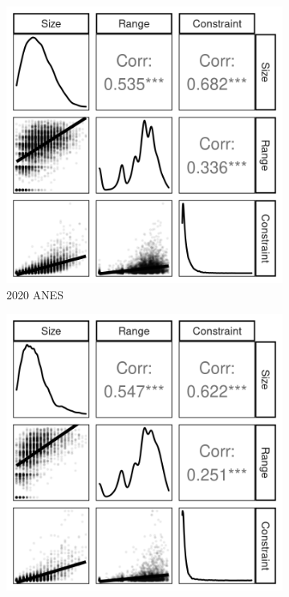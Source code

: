 \begin{figure}[h]
    \begin{subfigure}[h]{0.27\textwidth}
    	\centering
    	\includegraphics[width=\textwidth]{../fig/anes2020_components.png}
    	\caption{2020 ANES}
    \end{subfigure}%
    \begin{subfigure}[h]{0.27\textwidth}
        \centering
        \includegraphics[width=\textwidth]{../fig/anes2016_components.png}

\end{subfigure}
\end{figure}
